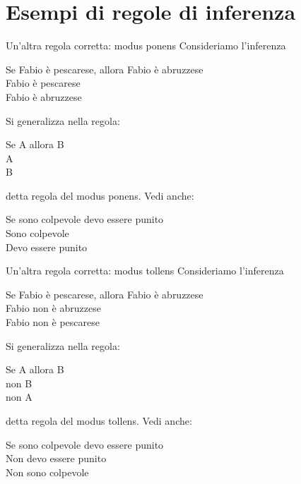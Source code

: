 \documentclass[aspectratio=169,10pt,dvipsnames,handout]{beamer}
\begin{document}
\section{Esempi di regole di inferenza}
\begin{frame}{Un'altra regola corretta: modus ponens}
	Consideriamo l'inferenza
	\begin{center}
		\begin{inference}
			Se Fabio è pescarese, allora Fabio è abruzzese\\
			Fabio è pescarese\\
			\hline
			Fabio è abruzzese
		\end{inference}
	\end{center}
	\pause
	Si generalizza nella regola:
	\begin{center}
		\begin{inference}
			Se A allora B\\
			A\\
			\hline
			B
		\end{inference}
	\end{center}
	detta \alert{regola del modus ponens}. Vedi anche:
	\begin{center}
		\begin{inference}
			Se sono colpevole devo essere punito\\
			Sono colpevole\\
			\hline
			Devo essere punito
		\end{inference}
	\end{center}
\end{frame}

\begin{frame}{Un'altra regola corretta: modus tollens}
	Consideriamo l'inferenza
	\begin{center}
		\begin{inference}
			Se Fabio è pescarese, allora Fabio è abruzzese\\
			Fabio non è abruzzese\\
			\hline
			Fabio non è pescarese
		\end{inference}
	\end{center}
	\pause
	Si generalizza nella regola:
	\begin{center}
		\begin{inference}
			Se A allora B\\
			non B\\
			\hline
			non A
		\end{inference}
	\end{center}
	detta \alert{regola del modus tollens}. Vedi anche:
	\begin{center}
		\begin{inference}
			Se sono colpevole devo essere punito\\
			Non devo essere punito\\
			\hline
			Non sono colpevole
		\end{inference}
	\end{center}
\end{frame}
\end{document}
